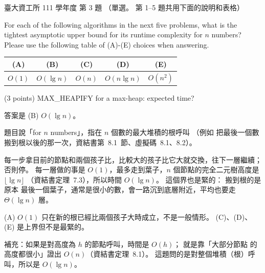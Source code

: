 \begin{pastexam}[label={px:ntu-111-dsaa-03}]{臺大資工所 111 學年度 第 3 題}
（單選。 第 1--5 題共用下面的說明和表格）

For each of the following algorithms in the next five problems, what is the tightest asymptotic
upper bound for its runtime complexity for $n$ numbers? Please use the following table of (A)-(E)
choices when answering.
\begin{center}
\begin{tabular}{c|c|c|c|c}
(A) & (B) & (C) & (D) & (E) \\ \hline
$O(1)$ & $O(\lg n)$ & $O(n)$ & $O(n\lg n)$ & $O(n^2)$
\end{tabular}
\end{center}

(3 points) MAX\_HEAPIFY for a max-heap: expected time?
\end{pastexam}

\begin{pastsoln}
答案是 (B) $O(\lg n)$。

題目說「for $n$ numbers」，指在 $n$ 個數的最大堆積的根呼叫 （例如
 把最後一個數搬到根以後的那一次，資結書第~8.1~節、虛擬碼~8.1、8.2）。

 每一步拿目前的節點和兩個孩子比，比較大的孩子比它大就交換，往下一層繼續；
否則停。 每一層做的事是 $O(1)$，最多走到葉子，$n$ 個節點的完全二元樹高度是 $\lfloor \lg n \rfloor$
（資結書定理~7.3），所以時間 $O(\lg n)$。 這個界也是緊的： 搬到根的是原本
最後一個葉子，通常是很小的數，會一路沉到底層附近，平均也要走 $\Theta(\lg n)$ 層。

(A) $O(1)$ 只在新的根已經比兩個孩子大時成立，不是一般情形。 (C)、(D)、(E) 是上界但不是最緊的。

補充：如果是對高度為 $h$ 的節點呼叫，時間是 $O(h)$； 就是靠「大部分節點
的高度都很小」證出 $O(n)$（資結書定理~8.1）。 這題問的是對整個堆積（根）呼叫，所以是 $O(\lg n)$。
\end{pastsoln}
